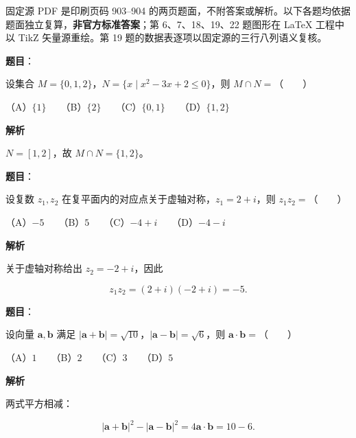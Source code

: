 

\begin{gktip}
固定源 PDF 是印刷页码 903–904 的两页题面，不附答案或解析。以下各题均依据题面独立复算，\textbf{非官方标准答案}；第 6、7、18、19、22 题图形在 LaTeX 工程中以 TikZ 矢量源重绘。第 19 题的数据表逐项以固定源的三行八列语义复核。
\end{gktip}


\begin{answer}

\textbf{题目}：

设集合 $M=\{0,1,2\}$，$N=\{x\mid x^2-3x+2\leqslant0\}$，则 $M\cap N=$\mbox{（　　）}

（A）$\{1\}$　　（B）$\{2\}$　　（C）$\{0,1\}$　　（D）$\{1,2\}$

\textbf{解析}

$N=[1,2]$，故 $M\cap N=\{1,2\}$。


\end{answer}
\begin{answer}

\textbf{题目}：

设复数 $z_1,z_2$ 在复平面内的对应点关于虚轴对称，$z_1=2+i$，则 $z_1z_2=$\mbox{（　　）}

（A）$-5$　　（B）$5$　　（C）$-4+i$　　（D）$-4-i$

\textbf{解析}

关于虚轴对称给出 $z_2=-2+i$，因此

\nopagebreak[4]
\[
z_1z_2=(2+i)(-2+i)=-5.
\]


\end{answer}
\begin{answer}

\textbf{题目}：

设向量 $\boldsymbol a,\boldsymbol b$ 满足 $|\boldsymbol a+\boldsymbol b|=\sqrt{10}$，$|\boldsymbol a-\boldsymbol b|=\sqrt6$，则 $\boldsymbol a\cdot\boldsymbol b=$\mbox{（　　）}

（A）$1$　　（B）$2$　　（C）$3$　　（D）$5$

\textbf{解析}

两式平方相减：

\nopagebreak[4]
\[
|\boldsymbol a+\boldsymbol b|^2-|\boldsymbol a-\boldsymbol b|^2
=4\boldsymbol a\cdot\boldsymbol b=10-6.
\]


\end{answer}
